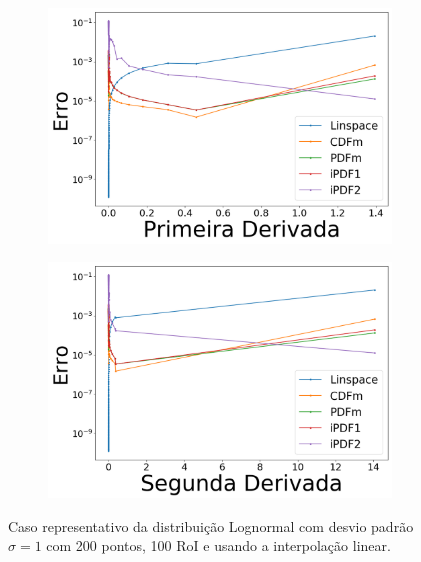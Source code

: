 \begin{figure}[H]
	\begin{subfigure}[b]{0.45\textwidth}
		\centering 
		\includegraphics[width=\textwidth]{./figuras/error_lognormal_linear_Primeira_Derivada_1.png}
		\caption{}
		\label{fig:error_log_lin_deriv}
	\end{subfigure}
	\hfill
	\begin{subfigure}[b]{0.45\textwidth}
		\centering 
		\includegraphics[width=\textwidth]{./figuras/error_lognormal_linear_Segunda_Derivada_1.png}
		\caption{}
		\label{fig:error_log_lin_deriv2}
	\end{subfigure}
	\caption{Caso representativo da distribuição Lognormal com desvio padrão $ \sigma = 1 $ com 200 pontos, 100 \ac{RoI} e usando a interpolação linear.}
	\label{fig:error_lognormal_linear}
\end{figure}

